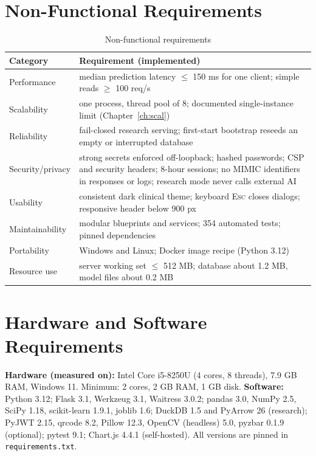 \section{Non-Functional Requirements}
\begin{table}[!htbp]
\centering
\caption{Non-functional requirements}
\label{tab:nfr}
\small
\begin{tabularx}{\textwidth}{@{}lY@{}}
\toprule
Category & Requirement (implemented)\\
\midrule
Performance & median prediction latency $\le$ 150 ms for one client; simple reads $\ge$ 100 req/s\\
Scalability & one process, thread pool of 8; documented single-instance limit (Chapter~\ref{ch:scal})\\
Reliability & fail-closed research serving; first-start bootstrap reseeds an empty or interrupted database\\
Security/privacy & strong secrets enforced off-loopback; hashed passwords; CSP and security headers; 8-hour sessions; no MIMIC identifiers in responses or logs; research mode never calls external AI\\
Usability & consistent dark clinical theme; keyboard \textsc{Esc} closes dialogs; responsive header below 900 px\\
Maintainability & modular blueprints and services; 354 automated tests; pinned dependencies\\
Portability & Windows and Linux; Docker image recipe (Python 3.12)\\
Resource use & server working set $\le$ 512 MB; database about 1.2 MB, model files about 0.2 MB\\
\bottomrule
\end{tabularx}
\end{table}

\section{Hardware and Software Requirements}
\textbf{Hardware (measured on):} Intel Core i5-8250U (4 cores, 8 threads), 7.9 GB RAM, Windows 11.
Minimum: 2 cores, 2 GB RAM, 1 GB disk. \textbf{Software:} Python 3.12; Flask 3.1, Werkzeug 3.1, Waitress
3.0.2; pandas 3.0, NumPy 2.5, SciPy 1.18, scikit-learn 1.9.1, joblib 1.6; DuckDB 1.5 and PyArrow 26
(research); PyJWT 2.15, qrcode 8.2, Pillow 12.3, OpenCV (headless) 5.0, pyzbar 0.1.9 (optional);
pytest 9.1; Chart.js 4.4.1 (self-hosted). All versions are pinned in \texttt{requirements.txt}.

